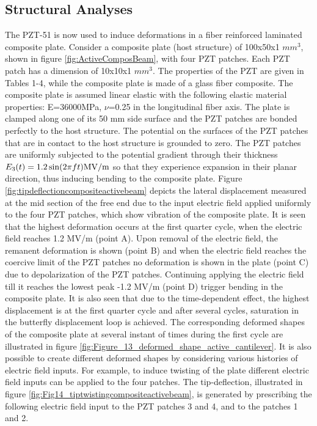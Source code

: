 \subsection{Structural Analyses}
The PZT-51 is now used to induce deformations in a fiber reinforced laminated composite plate. 
Consider a composite plate (host structure) of 100x50x1 $mm^3$, shown in figure \ref{fig:ActiveComposBeam}, with four PZT patches. 
Each PZT patch has a dimension of 10x10x1 $mm^3$. 
The properties of the PZT are given in Tables 1-4, while the composite plate is made of a glass fiber composite. 
The composite plate is assumed linear elastic with the following elastic material properties: E=36000MPa, $\nu$=0.25 in the longitudinal fiber axis. 
The plate is clamped along one of its 50 mm side surface and the PZT patches are bonded perfectly to the host structure. 
The potential on the surfaces of the PZT patches that are in contact to the host structure is grounded to zero. 
The PZT patches are uniformly subjected to the potential gradient through their thickness ${E_3}(t) = 1.2\sin (2\pi ft){\rm{ MV/m}}$ so that they experience expansion in their planar direction, thus inducing bending to the composite plate. 
Figure \ref{fig:tipdeflectioncompositeactivebeam} depicts the lateral displacement measured at the mid section of the free end due to the input electric field applied uniformly to the four PZT patches, which show vibration of the composite plate. 
It is seen that the highest deformation occurs at the first quarter cycle, when the electric field reaches 1.2 MV/m (point A).  
Upon removal of the electric field, the remanent deformation is shown (point B) and when the electric field reaches the coercive limit of the PZT patches no deformation is shown in the plate (point C) due to depolarization of the PZT patches. 
Continuing applying the electric field till it reaches the lowest peak -1.2 MV/m (point D) trigger bending in the composite plate. 
It is also seen that due to the time-dependent effect, the highest displacement is at the first quarter cycle and after several cycles, saturation in the butterfly displacement loop is achieved. 
The corresponding deformed shapes of the composite plate at several instant of times during the first cycle are illustrated in figure \ref{fig:Figure_13_deformed_shape_active_cantilever}. 
It is also possible to create different deformed shapes by considering various histories of electric field inputs. 
For example, to induce twisting of the plate different electric field inputs can be applied to the four patches. 
The tip-deflection, illustrated in figure \ref{fig:Fig14_tiptwistingcompositeactivebeam}, is generated by prescribing the following electric field input to the PZT patches 3 and 4, and  to the patches 1 and 2.


